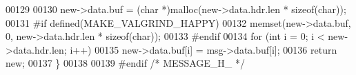 \begin{DoxyCode}
00129 
00130         \textcolor{keyword}{new}->data.buf = (\textcolor{keywordtype}{char} *)malloc(new->data.hdr.len * \textcolor{keyword}{sizeof}(\textcolor{keywordtype}{char}));
00131 \textcolor{preprocessor}{ #if defined(MAKE\_VALGRIND\_HAPPY)}
00132         memset(new->data.buf, 0, new->data.hdr.len * \textcolor{keyword}{sizeof}(\textcolor{keywordtype}{char}));
00133 \textcolor{preprocessor}{ #endif}
00134         \textcolor{keywordflow}{for} (\textcolor{keywordtype}{int} i = 0; i < \textcolor{keyword}{new}->data.hdr.len; i++)
00135                 new->data.buf[i] = msg->data.buf[i];
00136         \textcolor{keywordflow}{return} \textcolor{keyword}{new};
00137 \}
00138 
00139 \textcolor{preprocessor}{#endif }\textcolor{comment}{/* MESSAGE\_H\_ */}\textcolor{preprocessor}{}
\end{DoxyCode}
